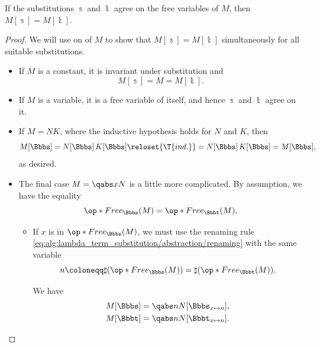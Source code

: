\begin{proposition}\label{thm:lambda_substitutions_agree}
  If the substitutions \( \Bbbs \) and \( \Bbbt \) agree on the free variables of \( M \), then \( M[\Bbbs] = M[\Bbbt] \).
\end{proposition}
\begin{proof}
  We will use  on of \( M \) to show that \( M[\Bbbs] = M[\Bbbt] \) simultaneously for all suitable substitutions.

  \begin{itemize}
    \item If \( M \) is a constant, it is invariant under substitution and
    \begin{equation*}
      M[\Bbbs] = M = M[\Bbbt].
    \end{equation*}

    \item If \( M \) is a variable, it is a free variable of itself, and hence \( \Bbbs \) and \( \Bbbt \) agree on it.

    \item If \( M = NK \), where the inductive hypothesis holds for \( N \) and \( K \), then
    \begin{equation*}
      M[\Bbbs]
      =
      N[\Bbbs] \thinspace K[\Bbbs]
      \reloset {\T{ind.}} =
      N[\Bbbs] \thinspace K[\Bbbs]
      =
      M[\Bbbs],
    \end{equation*}
    as desired.

    \item The final case \( M = \qabs x N \) is a little more complicated. By assumption, we have the equality
    \begin{equation*}
      \op*{Free}_\Bbbs(M) = \op*{Free}_\Bbbt(M),
    \end{equation*}

    \begin{itemize}
      \item If \( x \) is in \( \op*{Free}_\Bbbs(M) \), we must use the renaming rule \eqref{eq:alg:lambda_term_substitution/abstraction/renaming} with the same variable
      \begin{equation*}
        n \coloneqq \sharp(\op*{Free}_\Bbbs(M)) = \sharp(\op*{Free}_\Bbbt(M)).
      \end{equation*}

      We have
      \begin{align*}
        M[\Bbbs] &= \qabs n N[\Bbbs_{x \mapsto n}], \\
        M[\Bbbt] &= \qabs n N[\Bbbt_{x \mapsto n}].
      \end{align*}


\end{itemize}
\end{itemize}
\end{proof}
